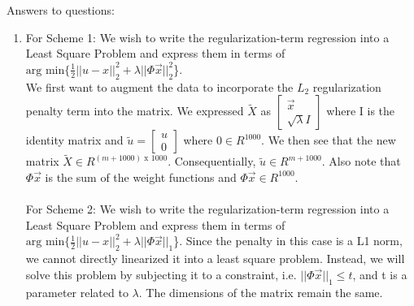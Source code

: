 \documentclass[a4paper]{article}
\begin{document}
Answers to questions:
\begin{enumerate}
\item  
\subitem For Scheme 1:
We wish to write the regularization-term regression into a Least Square Problem and express them in terms of \\ $\text{arg min} \{ \frac{1}{2} || u - x||^2_2 + \lambda || \Phi \vec{x}||^2_2$\}. \\ We first want to augment the data to incorporate the $L_2$ regularization penalty term into the matrix.  We  expressed $\tilde{X}$ as $\begin{bmatrix}
\vec{x} \\ \sqrt{\lambda}I \end{bmatrix}$ where I is the identity matrix and $\tilde{u} = \begin{bmatrix}
u \\ 0 \end{bmatrix}$ where $0 \in R^{1000}$. We then see that the new matrix  $\tilde{X} \in R^{(m + 1000) \text{ x } 1000}$. Consequentially, $\tilde{u} \in R^{m + 1000}$. Also note that $\Phi\vec{x}$ is the sum of the weight functions and $\Phi \vec{x} \in R^{1000}$. \\

\noindent{} \\ 

\subitem For Scheme 2: We wish to write the regularization-term regression into a Least Square Problem and express them in terms of \\ $\text{arg min} \{ \frac{1}{2} || u - x||^2_2 + \lambda || \Phi \vec{x}||_1 $\}. Since the penalty in this case is a L1 norm, we cannot directly linearized it into a least square problem. Instead, we will solve this problem by subjecting it to a constraint, i.e. $||\Phi\vec{x}||_1 \leq t $, and t is a parameter related to $\lambda $. The dimensions of the matrix remain the same. \\




\end{enumerate}
\end{document}
